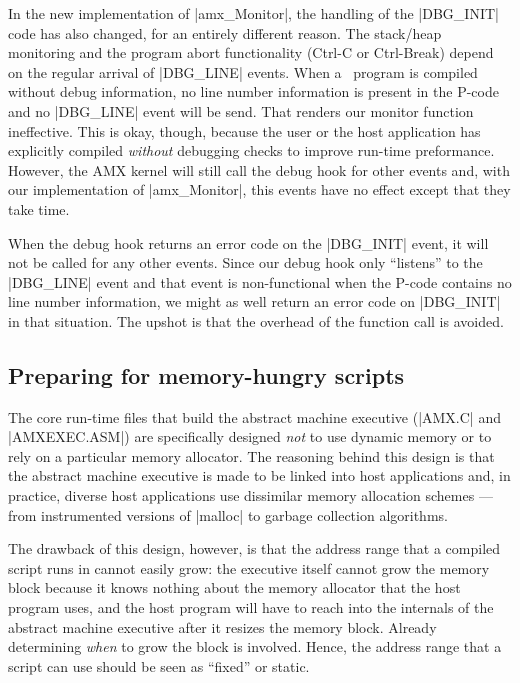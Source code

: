 In the new implementation of |amx_Monitor|, the handling of the |DBG_INIT| code
has also changed, for an entirely different reason. The stack\slash heap monitoring
and the program abort functionality (Ctrl-C or Ctrl-Break) depend on the regular
arrival of |DBG_LINE| events. When a \Small\ program is compiled without debug
information, no line number information is present in the P-code and no |DBG_LINE|
event will be send. That renders our monitor function ineffective. This is okay,
though, because the user or the host application has explicitly compiled {\it without\/}
debugging checks to improve run-time preformance. However, the AMX kernel
will still call the debug hook for other events and, with our implementation of
|amx_Monitor|, this events have no effect except that they take time.

When the debug hook returns an error code on the |DBG_INIT| event, it will not
be called for any other events. Since our debug hook only ``listens'' to the
|DBG_LINE| event and that event is non-functional when the P-code contains no
line number information, we might as well return an error code on |DBG_INIT|
in that situation. The upshot is that the overhead of the function call is
avoided.

\subsection{Preparing for memory-hungry scripts}
The core run-time files that build the abstract machine executive (|AMX.C| and
|AMXEXEC.ASM|) are specifically designed {\it not\/} to use dynamic memory or
to rely on a particular memory allocator. The reasoning behind this design is that the abstract machine
executive is made to be linked into host applications and, in practice,
diverse host applications use dissimilar memory allocation schemes ---from
instrumented versions of |malloc| to garbage collection algorithms.

The drawback of this design, however, is that the address range that a
compiled script runs in cannot easily grow: the executive itself cannot grow
the memory block because it knows nothing about the memory allocator that the
host program uses, and the host program will have to reach into the internals
of the abstract machine executive after it resizes the memory block. Already
determining {\it when\/} to grow the block is involved. Hence, the address range
that a script can use should be seen as ``fixed'' or static.

